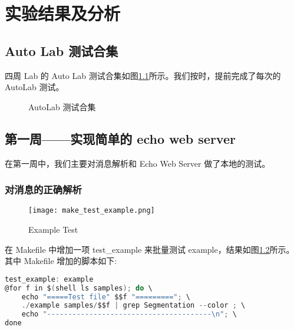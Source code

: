 \chapter{实验结果及分析}

\section{Auto Lab 测试合集}

四周 Lab 的 Auto Lab 测试合集如图\ref{fig:Autolabs}所示。我们按时，提前完成了每次的 AutoLab 测试。

\begin{figure}
    \centering
    \caption{AutoLab 测试合集}\label{fig:Autolabs}
\end{figure}

\section{第一周——实现简单的 echo web server}

在第一周中，我们主要对消息解析和 Echo Web Server 做了本地的测试。

\subsection{对消息的正确解析}

\begin{figure}[htbp!]
    \centering
    \texttt{[image: make\_test\_example.png]}
    \caption{Example Test}\label{fig:maketestexample}
    \vspace{-1em}
\end{figure}

在 Makefile 中增加一项 test\_example 来批量测试 example，结果如图\ref{fig:maketestexample}所示。其中 Makefile 增加的脚本如下:

\begin{lstlisting}[language=C, name={Makefile: test example}]
test_example: example
@for f in $(shell ls samples); do \
	echo "=====Test file" $$f "========="; \
	./example samples/$$f | grep Segmentation --color ; \
	echo "---------------------------------------\n"; \
done
\end{lstlisting}

